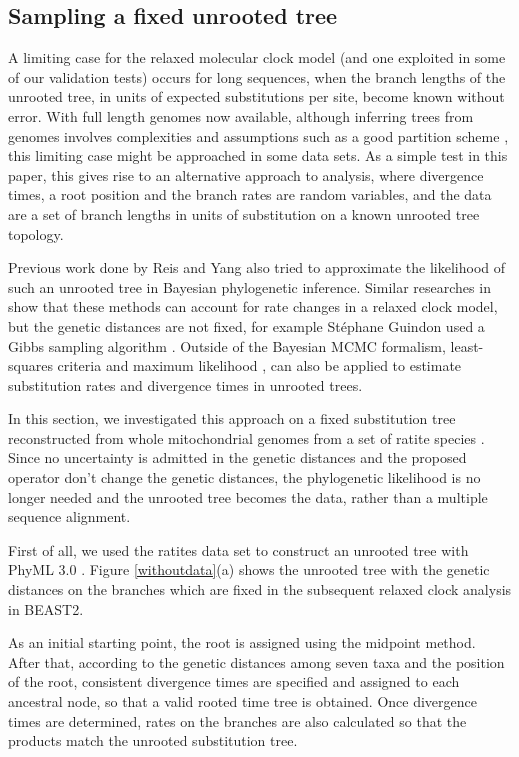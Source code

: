 \documentclass{bmcart}
\begin{document}
\subsection*{Sampling a fixed unrooted tree}
A limiting case for the relaxed molecular clock model (and one exploited in some of our validation tests) occurs for long sequences, when the branch lengths of the unrooted tree, in units of expected substitutions per site, become known without error. With full length genomes now available, although inferring trees from genomes involves complexities and assumptions such as a good partition scheme \cite{lanfear2012partitionfinder}, this limiting case might be approached in some data sets. As a simple test in this paper, this gives rise to an alternative approach to analysis, where divergence times, a root position and the branch rates are random variables, and the data are a set of branch lengths in units of substitution on a known unrooted tree topology. 

Previous work done by Reis and Yang \cite{reis2011approximate} also tried to approximate the likelihood of such an unrooted tree in Bayesian phylogenetic inference. Similar researches in \cite{thorne1998estimating,guindon2010bayesian} show that these methods can account for rate changes in a relaxed clock model, but the genetic distances are not fixed, for example St{\'e}phane Guindon used a Gibbs sampling algorithm \cite{guindon2010bayesian}. Outside of the Bayesian MCMC formalism, least-squares criteria \cite{to2015fast} and maximum likelihood \cite{sagulenko2018treetime,sanderson2003r8s}, can also be applied to estimate substitution rates and divergence times in unrooted trees. 

In this section, we investigated this approach on a fixed substitution tree reconstructed from whole mitochondrial genomes from a set of ratite species \cite{cooper2001complete}. Since no uncertainty is admitted in the genetic distances and the proposed operator don't change the genetic distances, the phylogenetic likelihood is no longer needed and the unrooted tree becomes the data, rather than a multiple sequence alignment.

First of all, we used the ratites data set to construct an unrooted tree with PhyML 3.0 \cite{phyml,guindon2010new}.  Figure \ref{withoutdata}(a) shows the unrooted tree with the genetic distances on the branches which are fixed in the subsequent relaxed clock analysis in BEAST2.

As an initial starting point, the root is assigned using the midpoint method. After that, according to the genetic distances among seven taxa and the position of the root, consistent divergence times are specified and assigned to each ancestral node, so that a valid rooted time tree is obtained. Once divergence times are determined, rates on the branches are also calculated so that the products match the unrooted substitution tree.
\end{document}
